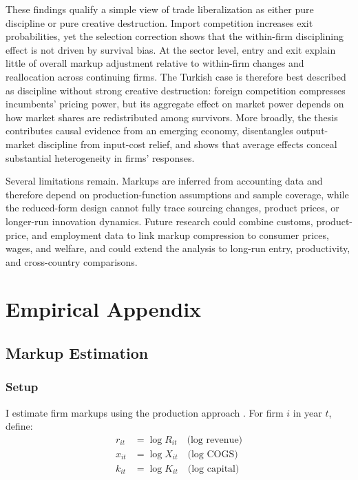 \documentclass[12pt]{article}
\begin{document}
These findings qualify a simple view of trade liberalization as either pure discipline or pure creative destruction. Import competition increases exit probabilities, yet the selection correction shows that the within-firm disciplining effect is not driven by survival bias. At the sector level, entry and exit explain little of overall markup adjustment relative to within-firm changes and reallocation across continuing firms. The Turkish case is therefore best described as discipline without strong creative destruction: foreign competition compresses incumbents' pricing power, but its aggregate effect on market power depends on how market shares are redistributed among survivors. More broadly, the thesis contributes causal evidence from an emerging economy, disentangles output-market discipline from input-cost relief, and shows that average effects conceal substantial heterogeneity in firms' responses.

Several limitations remain. Markups are inferred from accounting data and therefore depend on production-function assumptions and sample coverage, while the reduced-form design cannot fully trace sourcing changes, product prices, or longer-run innovation dynamics. Future research could combine customs, product-price, and employment data to link markup compression to consumer prices, wages, and welfare, and could extend the analysis to long-run entry, productivity, and cross-country comparisons.

\pagebreak

\printbibliography

\pagebreak

\appendix

\section{Empirical Appendix}

\subsection{Markup Estimation}

\subsubsection{Setup}

I estimate firm markups using the production approach \parencite{deridderHitchhikersGuideMarkup2026,deloeckerMarkupsFirmLevelExport2012}. For firm $i$ in year $t$, define:
\begin{align*}
r_{it} &= \log R_{it} \quad \text{(log revenue)} \\
x_{it} &= \log X_{it} \quad \text{(log COGS)} \\
k_{it} &= \log K_{it} \quad \text{(log capital)}
\end{align*}
\end{document}

